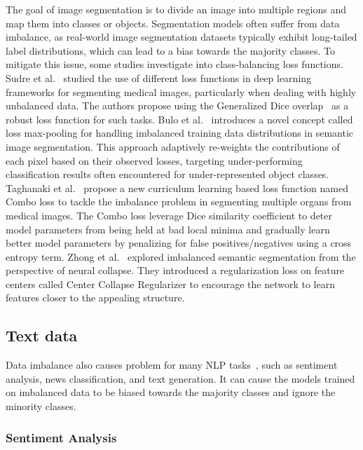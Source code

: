 The goal of image segmentation is to divide an image into multiple regions and map them into classes or objects. Segmentation models often suffer from data imbalance, as real-world image segmentation datasets typically exhibit long-tailed label distributions, which can lead to a bias towards the majority classes. To mitigate this issue, some studies investigate into class-balancing loss functions. Sudre et al.~\cite{sudre2017generalised} studied the use of different loss functions in deep learning frameworks for segmenting medical images, particularly when dealing with highly unbalanced data. The authors propose using the Generalized Dice overlap~\cite{crum2006generalized} as a robust loss function for such tasks. Bulo et al.~\cite{rota2017loss} introduces a novel concept called loss max-pooling for handling imbalanced training data distributions in semantic image segmentation. This approach adaptively re-weights the contributions of each pixel based on their observed losses, targeting under-performing classification results often encountered for under-represented object classes. Taghanaki et al.~\cite{taghanaki2019combo} propose a new curriculum learning based loss function named Combo loss to tackle the imbalance problem in segmenting multiple organs from medical images. The Combo loss leverage Dice similarity coefficient to deter model parameters from being held at bad local minima and gradually learn better model parameters by penalizing for false positives/negatives using a cross entropy term. Zhong et al.~\cite{zhong2023understanding} explored imbalanced semantic segmentation from the perspective of neural collapse. They introduced a regularization loss on feature centers called Center Collapse Regularizer to encourage the network to learn features closer to the appealing structure.


\subsection{Text data}
Data imbalance also causes problem for many NLP tasks~\cite{henning2022survey,zhao2024retrieval}, such as sentiment analysis, news classification, and text generation. It can cause the models trained on imbalanced data to be biased towards the majority classes and ignore the minority classes.

\subsubsection{Sentiment Analysis}\

